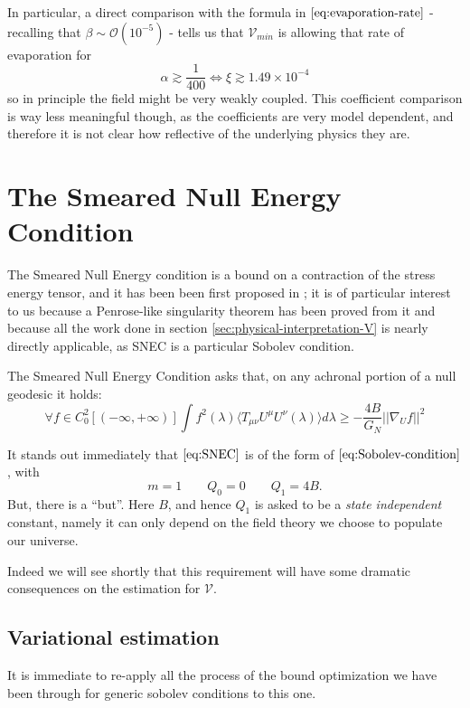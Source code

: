 In particular, a direct comparison with the formula in \(\eqref{eq:evaporation-rate}\) - recalling that  \(\beta \sim \mathcal{O}(10^{-5})\) - tells us that \(\mathcal{V}_{min}\) is allowing that rate of evaporation for 
\[
\alpha \gtrsim \frac{1}{400} \iff \xi \gtrsim 1.49 \times 10^{-4}	
\]
so in principle the field might be very weakly coupled. This coefficient comparison is way less meaningful though, as the coefficients are very model dependent, and therefore it is not clear how reflective of the underlying physics they are.

\section{The Smeared Null Energy Condition}
The Smeared Null Energy condition is a bound on a contraction of the stress energy tensor, and it has been been first proposed in \cite{freivogel2018smeared}; it is of particular interest to us because a Penrose-like singularity theorem has been proved from it \cite{freivogel2020return} and because all the work done in section \ref{sec:physical-interpretation-V} is nearly directly applicable, as SNEC is a particular Sobolev condition.

\begin{definition}
	The Smeared Null Energy Condition asks that, on any achronal portion of a null geodesic it holds:
	\begin{equation}
		\label{eq:SNEC}
		\forall f \in C_0^2[(-\infty, +\infty)] \int f^2(\lambda)\langle T_{\mu\nu}U^{\mu}U^{\nu}(\lambda) \rangle d\lambda \ge -\frac{4B}{G_N}\vert\vert \nabla_U f\vert\vert^2
	\end{equation}
\end{definition}

It stands out immediately that \(\eqref{eq:SNEC}\) is of the form of \(\eqref{eq:Sobolev-condition}\), with 
\[
m = 1 \quad \quad Q_0 = 0 \quad \quad Q_1 = 4B.	
\]
But, there is a ``but''. Here \(B\), and hence \(Q_1\) is asked to be a \emph{state independent} constant, namely it can only depend on the field theory we choose to populate our universe. 

Indeed we will see shortly that this requirement will have some dramatic consequences on the estimation for \(\mathcal{V}\).

\subsection{Variational estimation}
It is immediate to re-apply all the process of the bound optimization we have been through for generic sobolev conditions to this one.

